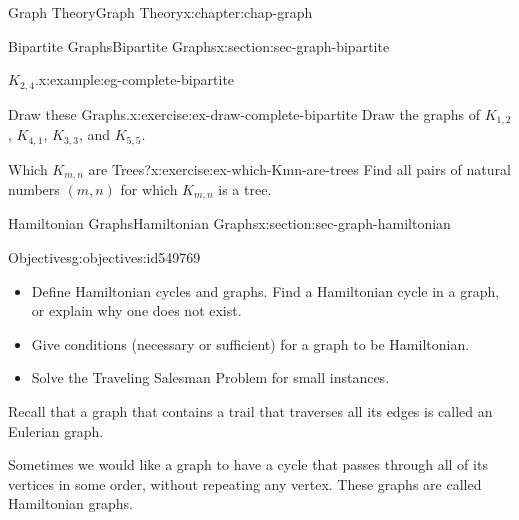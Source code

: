 \documentclass[oneside,10pt,]{book}
\numberwithin{equation}{section}
\begin{document}
\begin{chapterptx}{Graph Theory}{}{Graph Theory}{}{}{x:chapter:chap-graph}
\begin{sectionptx}{Bipartite Graphs}{}{Bipartite Graphs}{}{}{x:section:sec-graph-bipartite}
\begin{example}{\(K_{2,4}\).}{x:example:eg-complete-bipartite}
\begin{sidebyside}{1}{0.375}{0.375}{0}
\begin{sbspanel}{0.25}
{
}%
\end{sbspanel}%
\end{sidebyside}%
\end{example}
\begin{inlineexercise}{Draw these Graphs.}{x:exercise:ex-draw-complete-bipartite}%
Draw the graphs of \(K_{1,2}\), \(K_{4,1}\), \(K_{3,3}\), and \(K_{5,5}\).%
\end{inlineexercise}%
\begin{inlineexercise}{Which \(K_{m,n}\) are Trees?}{x:exercise:ex-which-Kmn-are-trees}%
Find all pairs of natural numbers \((m,n)\) for which \(K_{m,n}\) is a tree.%
\end{inlineexercise}%
\end{sectionptx}
%
%
\typeout{************************************************}
\typeout{************************************************}
%
\begin{sectionptx}{Hamiltonian Graphs}{}{Hamiltonian Graphs}{}{}{x:section:sec-graph-hamiltonian}
\begin{objectives}{Objectives}{g:objectives:id549769}
%
\begin{itemize}[label=\textbullet]
\item{}Define Hamiltonian cycles and graphs. Find a Hamiltonian cycle in a graph, or explain why one does not exist.%
\item{}Give conditions (necessary or sufficient) for a graph to be Hamiltonian.%
\item{}Solve the Traveling Salesman Problem for small instances.%
\end{itemize}
\end{objectives}
Recall that a graph that contains a trail that traverses all its edges is called an Eulerian graph.%
\par
Sometimes we would like a graph to have a cycle that passes through all of its vertices in some order, without repeating any vertex. These graphs are called Hamiltonian graphs.%

\end{sectionptx}
\end{chapterptx}
\end{document}
